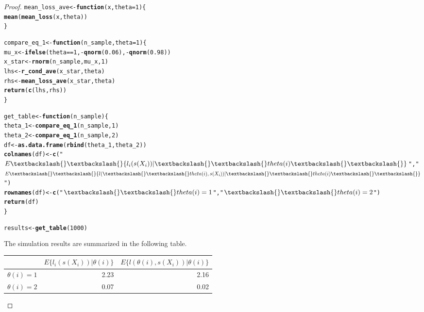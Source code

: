 \documentclass[letterpaper, 12pt]{article}\usepackage[]{graphicx}\usepackage[]{color}
\makeatletter
\newcommand{\hlnum}[1]{\textcolor[rgb]{0.686,0.059,0.569}{#1}}%
\newcommand{\hlstr}[1]{\textcolor[rgb]{0.192,0.494,0.8}{#1}}%
\newcommand{\hlopt}[1]{\textcolor[rgb]{0,0,0}{#1}}%
\newcommand{\hlstd}[1]{\textcolor[rgb]{0.345,0.345,0.345}{#1}}%
\newcommand{\hlkwa}[1]{\textcolor[rgb]{0.161,0.373,0.58}{\textbf{#1}}}%
\newcommand{\hlkwb}[1]{\textcolor[rgb]{0.69,0.353,0.396}{#1}}%
\newcommand{\hlkwc}[1]{\textcolor[rgb]{0.333,0.667,0.333}{#1}}%
\newcommand{\hlkwd}[1]{\textcolor[rgb]{0.737,0.353,0.396}{\textbf{#1}}}%
\newenvironment{kframe}{%
 \def\at@end@of@kframe{}%
 \ifinner\ifhmode%
  \def\at@end@of@kframe{\end{minipage}}%
  \begin{minipage}{\columnwidth}%
 \fi\fi%
 \def\FrameCommand##1{\hskip\@totalleftmargin \hskip-\fboxsep
 \colorbox{shadecolor}{##1}\hskip-\fboxsep
     \hskip-\linewidth \hskip-\@totalleftmargin \hskip\columnwidth}%
 \MakeFramed {\advance\hsize-\width
   \@totalleftmargin\z@ \linewidth\hsize
   \@setminipage}}%
 {\par\unskip\endMakeFramed%
 \at@end@of@kframe}
\newenvironment{knitrout}{}{} %
\makeatother
\begin{document}
\begin{proof}
\begin{knitrout}
\begin{kframe}
\begin{alltt}
\hlstd{mean_loss_ave} \hlkwb{<-} \hlkwa{function}\hlstd{(}\hlkwc{x}\hlstd{,} \hlkwc{theta} \hlstd{=} \hlnum{1}\hlstd{) \{}
    \hlkwd{mean}\hlstd{(}\hlkwd{mean_loss}\hlstd{(x, theta))}
\hlstd{\}}

\hlstd{compare_eq_1} \hlkwb{<-} \hlkwa{function}\hlstd{(}\hlkwc{n_sample}\hlstd{,} \hlkwc{theta} \hlstd{=} \hlnum{1}\hlstd{) \{}
    \hlstd{mu_x} \hlkwb{<-} \hlkwd{ifelse}\hlstd{(theta} \hlopt{==} \hlnum{1}\hlstd{,} \hlopt{-}\hlkwd{qnorm}\hlstd{(}\hlnum{0.06}\hlstd{),} \hlopt{-}\hlkwd{qnorm}\hlstd{(}\hlnum{0.98}\hlstd{))}
    \hlstd{x_star} \hlkwb{<-} \hlkwd{rnorm}\hlstd{(n_sample, mu_x,} \hlnum{1}\hlstd{)}
    \hlstd{lhs} \hlkwb{<-} \hlkwd{r_cond_ave}\hlstd{(x_star, theta)}
    \hlstd{rhs} \hlkwb{<-} \hlkwd{mean_loss_ave}\hlstd{(x_star, theta)}
    \hlkwd{return}\hlstd{(}\hlkwd{c}\hlstd{(lhs, rhs))}
\hlstd{\}}

\hlstd{get_table} \hlkwb{<-} \hlkwa{function}\hlstd{(}\hlkwc{n_sample}\hlstd{) \{}
    \hlstd{theta_1} \hlkwb{<-} \hlkwd{compare_eq_1}\hlstd{(n_sample,} \hlnum{1}\hlstd{)}
    \hlstd{theta_2} \hlkwb{<-} \hlkwd{compare_eq_1}\hlstd{(n_sample,} \hlnum{2}\hlstd{)}
    \hlstd{df} \hlkwb{<-} \hlkwd{as.data.frame}\hlstd{(}\hlkwd{rbind}\hlstd{(theta_1, theta_2))}
    \hlkwd{colnames}\hlstd{(df)} \hlkwb{<-} \hlkwd{c}\hlstd{(}\hlstr{"$E\textbackslash{}\textbackslash{}\{l_i(s(X_i))| \textbackslash{}\textbackslash{}theta(i)\textbackslash{}\textbackslash{}\}$"}\hlstd{,} \hlstr{"$E\textbackslash{}\textbackslash{}\{l(\textbackslash{}\textbackslash{}theta(i), s(X_i))|\textbackslash{}\textbackslash{}theta(i)\textbackslash{}\textbackslash{}\}$"}\hlstd{)}
    \hlkwd{rownames}\hlstd{(df)} \hlkwb{<-} \hlkwd{c}\hlstd{(}\hlstr{"$\textbackslash{}\textbackslash{}theta(i)=1$"}\hlstd{,} \hlstr{"$\textbackslash{}\textbackslash{}theta(i)=2$"}\hlstd{)}
    \hlkwd{return}\hlstd{(df)}
\hlstd{\}}

\hlstd{results} \hlkwb{<-} \hlkwd{get_table}\hlstd{(}\hlnum{1000}\hlstd{)}
\end{alltt}
\end{kframe}
\end{knitrout}


The simulation results are summarized in the following table.

\begin{table}[ht]
\centering
\begin{tabular}{rrr}
  \hline
 & $E\{l_i(s(X_i))| \theta(i)\}$ & $E\{l(\theta(i), s(X_i))|\theta(i)\}$ \\ 
  \hline
$\theta(i)=1$ & 2.23 & 2.16 \\ 
  $\theta(i)=2$ & 0.07 & 0.02 \\ 
   \hline
\end{tabular}
\end{table}


\end{proof}
\end{document}
